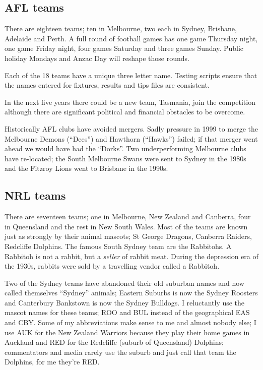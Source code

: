 \documentclass{article}
\begin{document}
\subsection{AFL teams}

There are eighteen teams; ten in Melbourne, two each in Sydney, Brisbane,
Adelaide and Perth. A full round of football games has one game
Thursday night, one game Friday night, four games Saturday and three
games Sunday. Public holiday Mondays and Anzac Day will reshape those
rounds.

Each of the 18 teams have a unique three letter name. Testing scripts
ensure that the names entered for fixtures, results and tips files are
consistent.

In the next five years there could be a new team, Tasmania, join the
competition although there are significant political and financial
obstacles to be overcome.

Historically AFL clubs have avoided mergers. Sadly pressure in 1999 to
merge the Melbourne Demons (``Dees'') and Hawthorn (``Hawks'')
failed; if that merger went ahead we would have had the ``Dorks''.
Two underperforming Melbourne clubs have re-located; the South
Melbourne Swans were sent to Sydney in the 1980s and the Fitzroy Lions
went to Brisbane in the 1990s.

\subsection{NRL teams}

There are seventeen teams; one in Melbourne, New Zealand and Canberra,
four in Queensland and the rest in New South Wales.
Most of the teams are known just as strongly
by their animal mascots; St George Dragons, Canberra Raiders,
Redcliffe Dolphins. The famous South Sydney team are the Rabbitohs. A
Rabbitoh is not a rabbit, but a \textit{seller} of rabbit meat. During
the depression era of the 1930s, rabbits were sold by a travelling
vendor called a Rabbitoh.

Two of the Sydney teams have abandoned their old suburban names
and now called themselves ``Sydney'' animals; Eastern Suburbs is now
the Sydney Roosters and Canterbury Bankstown is now the Sydney
Bulldogs. I reluctantly use the mascot names for these teams; ROO and
BUL instead of the geographical EAS and CBY. Some of my abbreviations
make sense to me and almost nobody else; I use AUK for the New Zealand
Warriors because they play their home games in Auckland and RED for
the Redcliffe (suburb of Queensland) Dolphins; commentators and media
rarely use the suburb and just call that team the Dolphins, for me
they're RED.
\end{document}
